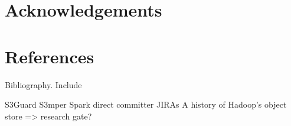 \documentclass[9pt,technote]{IEEEtran}
\begin{document}
\section{Acknowledgements}

\section{References}

Bibliography. Include



S3Guard
S3mper
Spark direct committer JIRAs
A history of Hadoop's object store => research gate?
\end{document}
